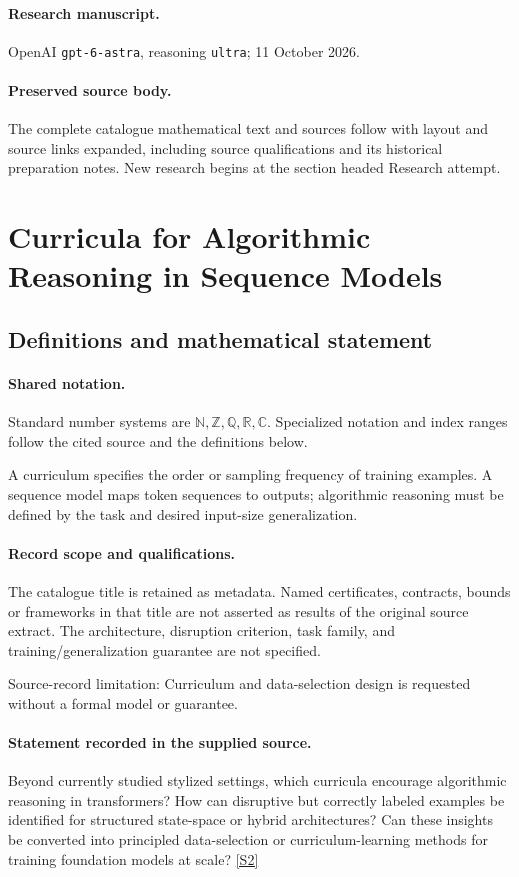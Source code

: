 \documentclass[11pt]{article}
\begin{document}
\paragraph{Research manuscript.} OpenAI \texttt{gpt-6-astra}, reasoning \texttt{ultra}; 11 October 2026.
\paragraph{Preserved source body.} The complete catalogue mathematical text and sources follow with layout and source links expanded, including source qualifications and its historical preparation notes. New research begins at the section headed Research attempt.

\section{Curricula for Algorithmic Reasoning in Sequence Models}\label{statement}

\subsection{Definitions and mathematical statement}

\paragraph{Shared notation.}Standard number systems are $\mathbb N,\mathbb Z,\mathbb Q,\mathbb R,\mathbb C$. Specialized notation and index ranges follow the cited source and the definitions below.


A curriculum specifies the order or sampling frequency of training examples. A sequence model maps token sequences to outputs; algorithmic reasoning must be defined by the task and desired input-size generalization.
\paragraph{Record scope and qualifications.}
The catalogue title is retained as metadata. Named certificates, contracts, bounds or frameworks in that title are not asserted as results of the original source extract.
The architecture, disruption criterion, task family, and training/generalization guarantee are not specified.

Source-record limitation: Curriculum and data-selection design is requested without a formal model or guarantee.
\paragraph{Statement recorded in the supplied source.}
Beyond currently studied stylized settings, which curricula encourage algorithmic reasoning in transformers? How can disruptive but correctly labeled examples be identified for structured state-space or hybrid architectures? Can these insights be converted into principled data-selection or curriculum-learning methods for training foundation models at scale? \href{https://doi.org/10.4171/owr/2026/11}{[S2]}
\end{document}
